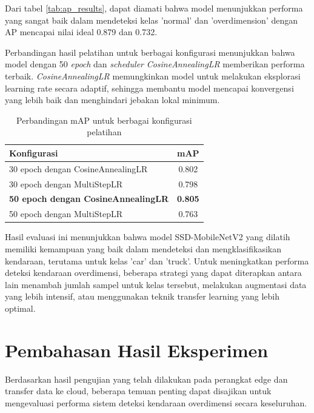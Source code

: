 Dari tabel \ref{tab:ap_results}, dapat diamati bahwa model menunjukkan performa yang sangat baik dalam mendeteksi kelas 'normal' dan 'overdimension' dengan AP mencapai nilai ideal 0.879 dan 0.732. 

Perbandingan hasil pelatihan untuk berbagai konfigurasi menunjukkan bahwa model dengan 50 \emph{epoch} dan \emph{scheduler} \emph{CosineAnnealingLR} memberikan performa terbaik. \emph{CosineAnnealingLR} memungkinkan model untuk melakukan eksplorasi learning rate secara adaptif, sehingga membantu model mencapai konvergensi yang lebih baik dan menghindari jebakan lokal minimum.

\begin{table}[htbp]
  \centering
  \begin{tabular}{|l|c|}
    \hline
    \rowcolor[HTML]{C0C0C0}
    \textbf{Konfigurasi} & \textbf{mAP} \\
    \hline
    30 epoch dengan CosineAnnealingLR & 0.802 \\
    \hline
    30 epoch dengan MultiStepLR & 0.798 \\
    \hline
    \textbf{50 epoch dengan CosineAnnealingLR} & \textbf{0.805} \\
    \hline
    50 epoch dengan MultiStepLR & 0.763 \\
    \hline
  \end{tabular}
  \caption{Perbandingan mAP untuk berbagai konfigurasi pelatihan}
  \label{fig:map_comparison}
\end{table}

Hasil evaluasi ini menunjukkan bahwa model SSD-MobileNetV2 yang dilatih memiliki kemampuan yang baik dalam mendeteksi dan mengklasifikasikan kendaraan, terutama untuk kelas 'car' dan 'truck'. Untuk meningkatkan performa deteksi kendaraan overdimensi, beberapa strategi yang dapat diterapkan antara lain menambah jumlah sampel untuk kelas tersebut, melakukan augmentasi data yang lebih intensif, atau menggunakan teknik transfer learning yang lebih optimal.

\section{Pembahasan Hasil Eksperimen}
\label{sec:pembahasanhasileksperimen}

Berdasarkan hasil pengujian yang telah dilakukan pada perangkat edge dan transfer data ke cloud, beberapa temuan penting dapat disajikan untuk mengevaluasi performa sistem deteksi kendaraan overdimensi secara keseluruhan.

